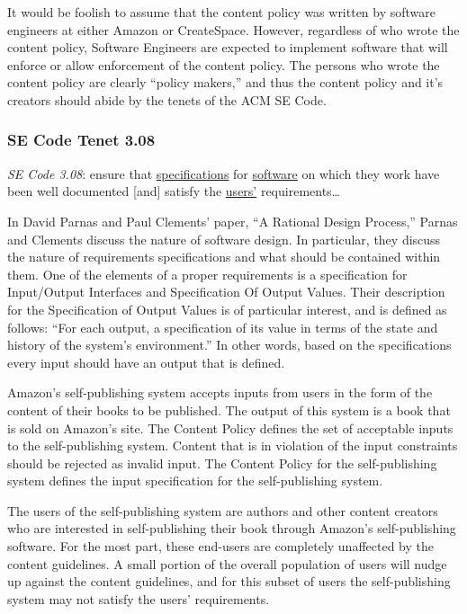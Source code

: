\documentclass[11pt]{article}
\begin{document}
\begin{multicols}{2}
It would be foolish to assume that the content policy was written by software engineers at either Amazon or CreateSpace.  However, regardless of who wrote the content policy, Software Engineers are expected to implement software that will enforce or allow enforcement of the content policy.  The persons who wrote the content policy are clearly ``policy makers,'' and thus the content policy and it's creators should abide by the tenets of the ACM SE Code.

\subsubsection{SE Code Tenet 3.08}

\emph{SE Code 3.08}: ensure that \underline{specifications} for \underline{software} on which they work have been well documented [and] satisfy the \underline{users'} requirements\ldots 

In David Parnas and Paul Clements' paper, ``A Rational Design Process,'' Parnas and Clements discuss the nature of software design. \cite{fakeit} In particular, they discuss the nature of requirements specifications and what should be contained within them.  One of the elements of a proper requirements is a specification for Input/Output Interfaces and Specification Of Output Values.  Their description for the Specification of Output Values is of particular interest, and is defined as follows: ``For each output, a specification of its value in terms of the state and history of the system's environment.'' \cite{fakeit} In other words, based on the specifications every input should have an output that is defined. 

Amazon's self-publishing system accepts inputs from users in the form of the content of their books to be published.  The output of this system is a book that is sold on Amazon's site.  The Content Policy defines the set of acceptable inputs to the self-publishing system.  Content that is in violation of the input constraints should be rejected as invalid input.  The Content Policy for the self-publishing system defines the input specification for the self-publishing system. 

The users of the self-publishing system are authors and other content creators who are interested in self-publishing their book through Amazon's self-publishing software.  For the most part, these end-users are completely unaffected by the content guidelines.  A small portion of the overall population of users will nudge up against the content guidelines, and for this subset of users the self-publishing system may not satisfy the users' requirements.


\end{multicols}
\end{document}
